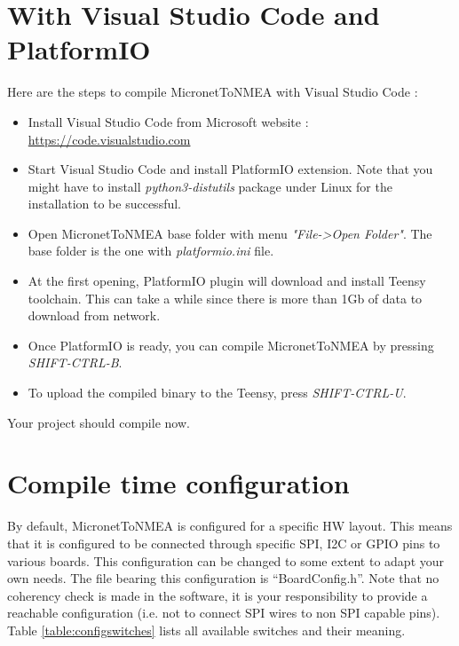 \documentclass{report}
\begin{document}
\section{With Visual Studio Code and PlatformIO}

Here are the steps to compile MicronetToNMEA with Visual Studio Code :

\begin{itemize}
\item Install Visual Studio Code from Microsoft website : \url{https://code.visualstudio.com}
\item Start Visual Studio Code and install PlatformIO extension. Note that you might have to install \emph{python3-distutils} package under Linux for the installation to be successful.
\item Open MicronetToNMEA base folder with menu \emph{"File->Open Folder"}. The base folder is the one with \emph{platformio.ini} file.
\item At the first opening, PlatformIO plugin will download and install Teensy toolchain. This can take a while since there is more than 1Gb of data to download from network.
\item Once PlatformIO is ready, you can compile MicronetToNMEA by pressing \emph{SHIFT-CTRL-B}.
\item To upload the compiled binary to the Teensy, press \emph{SHIFT-CTRL-U}.
\end{itemize}

Your project should compile now.

\section{Compile time configuration}
\label{compile-time-configuration}

By default, MicronetToNMEA is configured for a specific HW layout. This means that it is configured to be connected through specific SPI, I2C or GPIO pins to various boards. This configuration can be changed to some extent to adapt your own needs. The file bearing this configuration is “BoardConfig.h”. Note that no coherency check is made in the software, it is your responsibility to provide a reachable configuration (i.e. not to connect SPI wires to non SPI capable pins). Table {\ref{table:configswitches}} lists all available switches and their meaning.
\end{document}
